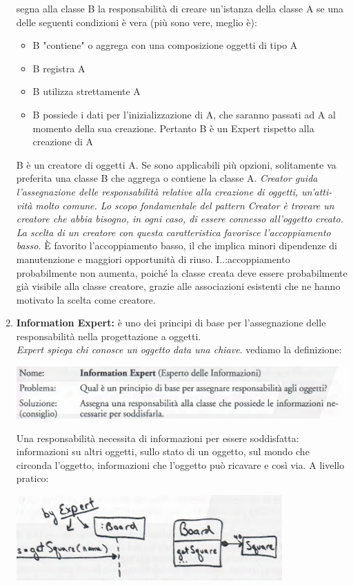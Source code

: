 \documentclass[a4paper,12pt, oneside]{book}
\begin{document}
\begin{enumerate}
segna alla classe B la responsabilità di creare un'istanza della classe A se una
delle seguenti condizioni è vera (più sono vere, meglio è):
\begin{itemize}
\item B "contiene" o aggrega con una composizione oggetti di tipo A
\item B registra A
\item B utilizza strettamente A
\item B possiede i dati per l'inizializzazione di A, che saranno passati ad A al momento
della sua creazione. Pertanto B è un Expert rispetto alla creazione di A
\end{itemize}
B è un creatore di oggetti A.
Se sono applicabili più opzioni, solitamente va preferita una classe B che aggrega o contiene la classe A.
\textit{Creator guida l'assegnazione delle responsabilità relative alla creazione di oggetti, un'atti-
vità molto comune. Lo scopo fondamentale del pattern Creator è trovare un creatore che
abbia bisogno, in ogni caso, di essere connesso all'oggetto creato. La scelta di un creatore
con questa caratteristica favorisce l'accoppiamento basso.}
È favorito l'accoppiamento basso, il che implica minori dipendenze di manutenzione e maggiori opportunità di riuso. I..:accoppiamento probabilmente non aumenta,
poiché la classe creata deve essere probabilmente già visibile alla classe creatore,
grazie alle associazioni esistenti che ne hanno motivato la scelta come creatore.
\item \textbf{Information Expert:} è uno dei principi di base per
  l'assegnazione delle responsabilità nella progettazione a oggetti.\\
  \textit{Expert spiega chi conosce un oggetto data una chiave}. vediamo la definizione:
\begin{center}
\includegraphics[scale = 0.7]{img/grasp5.png}
\end{center}
Una responsabilità necessita di informazioni per essere soddisfatta: informazioni su altri
oggetti, sullo stato di un oggetto, sul mondo che circonda l'oggetto, informazioni che
l'oggetto può ricavare e così via. A livello pratico:
\begin{center}
\includegraphics[scale = 0.7]{img/grasp7.png}

\end{center}
\end{enumerate}
\end{document}
